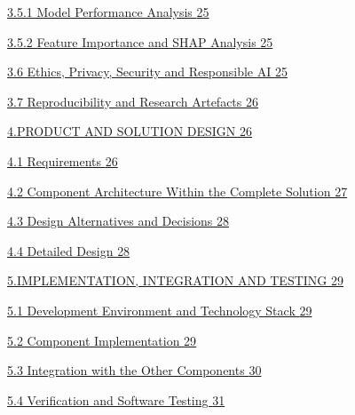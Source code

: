 \documentclass[
]{article}
\begin{document}
\protect\hyperlink{model-performance-analysis}{3.5.1 Model Performance
Analysis \protect\hyperlink{model-performance-analysis}{25}}

\protect\hyperlink{feature-importance-and-shap-analysis}{3.5.2 Feature
Importance and SHAP Analysis
\protect\hyperlink{feature-importance-and-shap-analysis}{25}}

\protect\hyperlink{ethics-privacy-security-and-responsible-ai}{3.6
Ethics, Privacy, Security and Responsible AI
\protect\hyperlink{ethics-privacy-security-and-responsible-ai}{25}}

\protect\hyperlink{reproducibility-and-research-artefacts}{3.7
Reproducibility and Research Artefacts
\protect\hyperlink{reproducibility-and-research-artefacts}{26}}

\protect\hyperlink{_Toc242376629}{4.PRODUCT AND SOLUTION DESIGN
\protect\hyperlink{_Toc242376629}{26}}

\protect\hyperlink{requirements}{4.1 Requirements
\protect\hyperlink{requirements}{26}}

\protect\hyperlink{component-architecture-within-the-complete-solution}{4.2
Component Architecture Within the Complete Solution
\protect\hyperlink{component-architecture-within-the-complete-solution}{27}}

\protect\hyperlink{design-alternatives-and-decisions}{4.3 Design
Alternatives and Decisions
\protect\hyperlink{design-alternatives-and-decisions}{28}}

\protect\hyperlink{detailed-design}{4.4 Detailed Design
\protect\hyperlink{detailed-design}{28}}

\protect\hyperlink{implementation-integration-and-testing}{5.IMPLEMENTATION,
INTEGRATION AND TESTING
\protect\hyperlink{implementation-integration-and-testing}{29}}

\protect\hyperlink{development-environment-and-technology-stack}{5.1
Development Environment and Technology Stack
\protect\hyperlink{development-environment-and-technology-stack}{29}}

\protect\hyperlink{component-implementation}{5.2 Component
Implementation \protect\hyperlink{component-implementation}{29}}

\protect\hyperlink{integration-with-the-other-components}{5.3
Integration with the Other Components
\protect\hyperlink{integration-with-the-other-components}{30}}

\protect\hyperlink{verification-and-software-testing}{5.4 Verification
and Software Testing
\protect\hyperlink{verification-and-software-testing}{31}}
\end{document}
